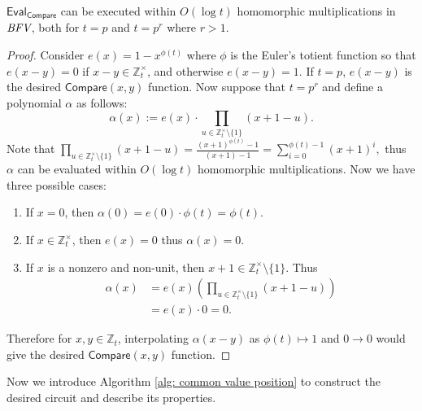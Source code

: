 \documentclass[runningheads]{llncs}
\newcommand{\bb}[1]{\mathbb{#1}}  %
\begin{document}
    \begin{lemma}
        $\mathsf{Eval}_{\mathsf{Compare}}$ can be executed within $O(\log t)$ homomorphic multiplications in $\emph{BFV}$, both for $t=p$ and $t=p^r$ where $r>1$.
    \end{lemma}
    \begin{proof}
        Consider $e(x)=1-x^{\phi(t)}$ where $\phi$ is the Euler's totient function so that $e(x-y)=0$ if $x-y\in \bb Z_t^\times$, and otherwise $e(x-y)=1$. 
        If $t=p$, $e(x-y)$ is the desired $\mathsf{Compare}(x,y)$ function.
        Now suppose that $t=p^r$ and define a polynomial $\alpha$ as follows:
        \[
            \alpha(x):=e(x) \cdot \prod_{u\in \bb Z_t^\times\setminus \{1\}}(x+1-u).
        \] 
        Note that $\displaystyle\prod_{u\in \bb Z_t^\times\setminus \{1\}}(x+1-u)=\frac{(x+1)^{\phi(t)}-1}{(x+1)-1}=\sum_{i=0}^{\phi(t)-1}(x+1)^i,$ thus $\alpha$ can be evaluated within $O(\log t)$ homomorphic multiplications. Now we have three possible cases:

        \begin{enumerate}
            \item  If $x=0$, then $\alpha(0)=e(0)\cdot \phi(t)=\phi(t)$. 
            \item  If $x\in \bb Z_t^\times$, then $e(x)=0$ thus $\alpha(x)=0$.
            \item  If $x$ is a nonzero and non-unit, then $x+1\in \bb Z_t^\times\setminus\{1\}$. Thus 
                \begin{align*}
                   \alpha(x)&=e(x)\left(\prod_{u\in \bb Z_t^\times\setminus \{1\}}(x+1-u)\right)\\
                           &=e(x)\cdot 0=0.
                \end{align*}
        \end{enumerate}
        
        Therefore for $x,y\in \bb Z_t$, interpolating $\alpha(x-y)$ as $\phi(t)\mapsto 1$ and $0\to 0$ would give the desired $\textsf{Compare}(x,y)$ function.      
    \end{proof}

    Now we introduce Algorithm \ref{alg: common value position} to construct the desired circuit and describe its properties.
    
\end{document}
